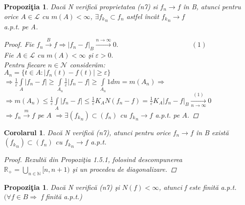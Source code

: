\documentclass[ a4paper, 12pt]{report}
\newtheorem{prop}[theorem]{\bf Propozi\c tia }
\newtheorem{cor}[theorem]{\bf Corolarul}
\theoremstyle{remark}
\numberwithin{equation}{section}
\begin{document}
\begin{prop}
Dac\u a N verific\u a proprietatea (n7) si $f_n \rightarrow f$ \^in B, atunci pentru orice $A \in \mathcal{L}$ cu $m(A)<\infty$,
$\exists{f_k}_n \subset f_n$ astfel \^inc\^at ${f_k}_n \rightarrow f$ \\a.p.t. pe A.
\begin{proof}
Fie $f_n \xrightarrow{B} f \Rightarrow {\lvert f_n-f \rvert}_B \xrightarrow{n \rightarrow \infty} 0.$ $ \hspace{124pt} (1)$\\
Fie $A \in \mathcal{L}$ cu $m(A)<\infty$ \c si $\varepsilon>0.$\\
Pentru fiecare $n \in \mathcal{N}$ consider\u am:\\
$A_n=\{t \in A : \lvert f_n(t)-f(t) \rvert \geq \varepsilon \}$\\
$\Rightarrow \frac{1}{\varepsilon} \int\limits_{A}^{}{\lvert f_n-f \rvert} \geq  \int\limits_{A_n}^{}{\frac{1}{\varepsilon} \lvert f_n-f \rvert} \geq \int\limits_{A_n}{}{1 dm} = m(A_n) \Rightarrow$ \\ $\Rightarrow m(A_n) \leq \frac{1}{\varepsilon} \int\limits_{A}^{}{\lvert f_n-f \rvert} \leq \frac{1}{\varepsilon} K_A N(f_n-f)=\frac{1}{\varepsilon} K_A {\lvert f_n-f \rvert}_B \xrightarrow[n \rightarrow \infty]{(1)} 0$\\
$\Rightarrow f_	n \xrightarrow{m} f$ pe $A$ $\Rightarrow \exists ({f_k}_n) \subset (f_n)$ cu ${f_k}_n \rightarrow f$ a.p.t. pe $A$.
\end{proof}
\end{prop}
\begin{cor}
Dac\u a N verific\u a (n7), atunci pentru orice $f_n \rightarrow f$ \^in B exist\u a $({f_k}_n) \subset (f_n)$ cu ${f_k}_n \rightarrow f$ a.p.t.
\begin{proof}
Rezult\u a din Propozi\c tia 1.5.1, folosind descompunerea\\ $\mathbb{R_+}=\bigcup\limits_{n \in \mathbb{N}}^{}{[n,n+1)}$ \c si un procedeu de diagonalizare.
\end{proof}
\end{cor}
\newpage
\begin{prop}
Dac\u a N verific\u a (n7) \c si $N(f)<\infty$, atunci f este finit\u a a.p.t. $(\forall f \in B \Rightarrow$ f  finit\u a a.p.t.)
\end{prop}
\end{document}

